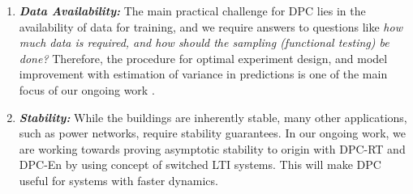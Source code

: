 \begin{enumerate}
\item \emph{\textbf{Data Availability:}} \textcolor[rgb]{0,0,1}{The main practical challenge for DPC lies in the availability of data for training, and we require answers to questions like \emph{how much data is required, and how should the sampling (functional testing) be done?} Therefore, the procedure for optimal experiment design, and model improvement with estimation of variance in predictions is one of the main focus of our ongoing work \cite{JainICCPS2018}}.
\item \emph{\textbf{Stability:}} While the buildings are inherently stable, many other applications, such as power networks, require stability guarantees. In our ongoing work, we are working towards proving asymptotic stability to origin with DPC-RT and DPC-En by using concept of switched LTI systems. This will make DPC useful for systems with faster dynamics.
\end{enumerate}